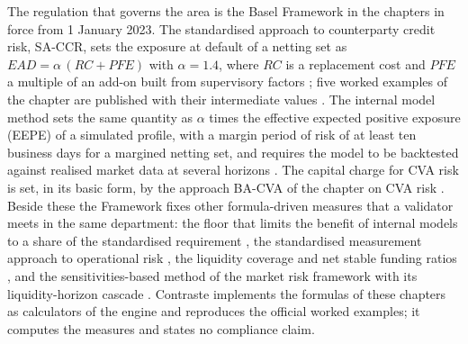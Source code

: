 The regulation that governs the area is the Basel Framework in the chapters in force from 1 January 2023. The standardised approach to
counterparty credit risk, SA-CCR, sets the exposure at default of a netting set as $EAD=\alpha\,(RC+PFE)$ with $\alpha=1.4$, where
$RC$ is a replacement cost and $PFE$ a multiple of an add-on built from supervisory factors \citep{ccr:cre52}; five worked examples
of the chapter are published with their intermediate values \citep{ccr:cre99}. The internal model method sets the same quantity as
$\alpha$ times the effective expected positive exposure (EEPE) of a simulated profile, with a margin period of risk of at least ten
business days for a margined netting set, and requires the model to be backtested against realised market data at several horizons
\citep{ccr:cre53,ccr:bcbs185}. The capital charge for CVA risk is set, in its basic form, by the approach BA-CVA of the chapter on CVA
risk \citep{ccr:mar50}. Beside these the Framework fixes other formula-driven measures that a validator meets in the same department:
the floor that limits the benefit of internal models to a share of the standardised requirement \citep{ccr:rbc20,ccr:rbc90}, the
standardised measurement approach to operational risk \citep{ccr:ope25}, the liquidity coverage and net stable funding ratios
\citep{ccr:lcr,ccr:nsf}, and the sensitivities-based method of the market risk framework with its liquidity-horizon cascade
\citep{ccr:mar21,ccr:mar33}. Contraste implements the formulas of these chapters as calculators of the engine and reproduces the
official worked examples; it computes the measures and states no compliance claim.

